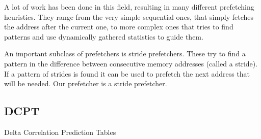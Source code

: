 A lot of work has been done in this field, resulting in many different
prefetching heuristics. They range from the very simple sequential ones, that
simply fetches the address after the current one, to more complex ones that
tries to find patterns and use dynamically gathered statistics to guide them.

An important subclass of prefetchers is stride prefetchers. These try to find a
pattern in the difference between consecutive memory addresses (called a
stride). If a pattern of strides is found it can be used to prefetch the next
address that will be needed. Our prefetcher is a stride prefetcher.

\subsection{}


\subsection{DCPT}
Delta Correlation Prediction Tables
\cite{dcpt}
